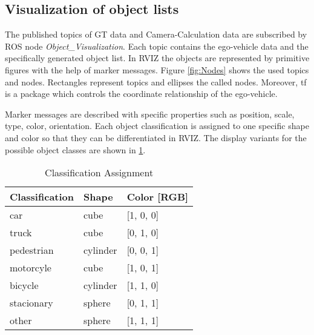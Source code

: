 \subsection{Visualization of object lists}

The published topics of \ac{GT} data and Camera-Calculation data are subscribed by \ac{ROS} node \textit{Object\_Visualization}. Each topic contains the ego-vehicle data and the specifically generated object list. In \ac{RVIZ} the objects are represented by primitive figures with the help of marker messages. Figure \ref{fig:Nodes} shows the used topics and nodes. Rectangles represent topics and ellipses the called nodes. Moreover, tf is a package which controls the coordinate relationship of the ego-vehicle.
\begin{figure*}[thpb]
	\centering
	\caption{Nodes (ellipses)/ Topics (rectangles) in \ac{ROS}}
	\label{fig:Nodes}
\end{figure*}
Marker messages are described with specific properties such as position, scale, type, color, orientation. Each object classification is assigned to one specific shape and color so that they can be differentiated in \ac{RVIZ}. The display variants for the possible object classes are shown in \cref{ClassificationAssignment}. 
\begin{table}[h]
	\caption{Classification Assignment}
	\begin{tabularx}{\columnwidth}{XXX}
		\toprule
		Classification & Shape & Color [RGB]\\
		\toprule
		car & cube & [1, 0, 0]\\
		truck & cube & [0, 1, 0]\\
		pedestrian & cylinder & [0, 0, 1]\\
		motorcyle & cube & [1, 0, 1]\\
		bicycle & cylinder & [1, 1, 0]\\
		stacionary & sphere & [0, 1, 1]\\
		other & sphere & [1, 1, 1]\\
		\bottomrule
	\end{tabularx}
	\label{ClassificationAssignment}
\end{table}

